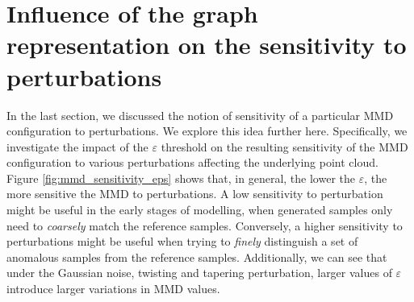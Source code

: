 
\section{Influence of the graph representation on the sensitivity to perturbations}\label{sec:results_sensitivity}

In the last section, we discussed the notion of sensitivity of a particular MMD
configuration to perturbations. We explore this idea further here. Specifically,
we investigate the impact of the $\varepsilon$ threshold on the resulting
sensitivity of the MMD configuration to various perturbations affecting the
underlying point cloud. Figure \ref{fig:mmd_sensitivity_eps} shows that, in
general, the lower the $\varepsilon$, the more sensitive the MMD to
perturbations. A low sensitivity to perturbation might be useful in the early
stages of modelling, when generated samples only need to \emph{coarsely} match
the reference samples. Conversely, a higher sensitivity to perturbations might
be useful when trying to \emph{finely} distinguish a set of anomalous samples
from the reference samples. Additionally, we can see that under the Gaussian
noise, twisting and tapering perturbation, larger values of $\varepsilon$
introduce larger variations in MMD values.

